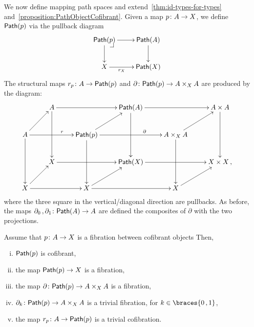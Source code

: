 \documentclass[reqno,10pt,a4paper,oneside,draft]{amsart}
\begin{document}








We now define mapping path spaces and  extend~\cref{thm:id-types-for-types} and~\cref{proposition:PathObjectCofibrant}. Given a map $p \colon A \to X$, we define $\mathsf{Path}(p)$ 
via the pullback diagram
\[
\xymatrix{
\Path(p) \drpullback \ar[r] \ar[d] & \Path(A) \ar[d] \\
X \ar[r]_-{r_X} & \Path(X) }
\]
The structural maps $r_p \colon A \rightarrow \mathsf{Path}(p)$ and $\partial \colon \mathsf{Path}(p) \rightarrow A \times_{X} A$ are produced by the diagram:
\[
\xymatrix{
& A \ar[rr] \ar[dd] & & \Path(A) \ar[rr] \ar[dd] & & A \times A \ar[dd] \\
A \ar[ur] \ar[rr]^(.6){r}  \ar[dd] & & \Path(p) \ar[ur] \ar[rr]^(.65){\partial} \ar[dd] & & A \times_{X} A \ar[ur] \ar[dd] \\
& X \ar[rr] & & \Path(X) \ar[rr] & & X \times X \, , \\
X \ar[ur] \ar[rr] & & X \ar[rr] \ar[ur] & & X \ar[ur] \\ 
}
\]
where the three square in the vertical/diagonal direction are pullbacks. As before, the maps
$\partial_0 \, , \partial_1 \colon \mathsf{Path}(A) \to A$ are defined the composites of $\partial$
with the two projections. 


\begin{theorem}
\label{thm:MainPathObject}
Assume that $p \colon A \rightarrow X $ is a fibration between cofibrant objects Then,
\begin{enumerate}[(i)] 
\item \label{thm:MainPathObject:IdBifib} $\mathsf{Path}(p)$ is cofibrant, 
\item the map $\mathsf{Path}(p) \rightarrow X$ is a fibration,
\item the map $\partial \colon \mathsf{Path}(p) \rightarrow A \times_{X} A$ is a fibration,
\item $\partial_k \colon \mathsf{Path}(p) \rightarrow A \times_{X} A$  is a trivial fibration, for $k \in \braces{0 \, , 1 }$,
\item the map $r_p \colon A \rightarrow \mathsf{Path}(p)$ is a trivial cofibration.
\end{enumerate}
\end{theorem}
\end{document}
